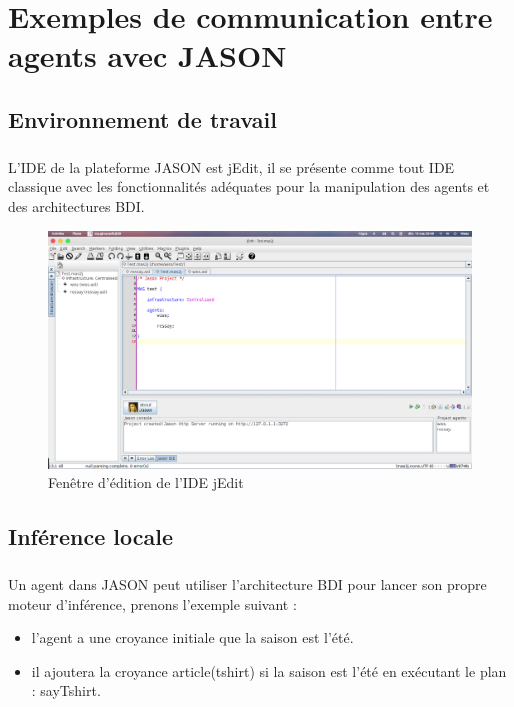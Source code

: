 \chapter{Exemples de communication entre agents avec JASON}
\section{Environnement de travail}
\paragraph{}
L'IDE de la plateforme JASON est jEdit, il se présente comme tout IDE classique avec les fonctionnalités adéquates pour la manipulation des agents et des architectures BDI.
\begin{figure}[H]
	\centering
	\includegraphics[width=\textwidth]{imgs/jEdit.png}
	\caption{Fenêtre d'édition de l'IDE jEdit}
\end{figure}
\newpage
\section{Inférence locale}
\paragraph{}
Un agent dans JASON peut utiliser l'architecture BDI pour lancer son propre moteur d'inférence, prenons l'exemple suivant : \\
\begin{itemize}[label=\textbullet]
	\item l'agent a une croyance initiale que la saison est l'été.
	\item il ajoutera la croyance article(tshirt) si la saison est l'été en exécutant le plan : sayTshirt.
\end{itemize}

